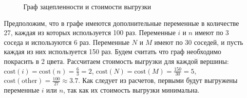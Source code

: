 \begin{figure}[H]
    \centering
    \caption{Граф зацепленности и стоимости выгрузки}
\end{figure}


Предположим, что в графе имеются дополнительные переменные в количестве 27, каждая из которых используется 100 раз.  
Переменные $i$ и $n$ имеют по 3 соседа и используются 6 раз.
Переменные $N$ и $M$ имеют по 30 соседей, и пусть каждая из них используется 150 раз.
Будем считать что граф необходимо покрасить в 2 цвета.
Рассчитаем стоимость выгрузки для каждой вершины:
$\text{cost}(i) = \text{cost}(n) = \frac{6}{3} = 2$,
$\text{cost}(N) = \text{cost}(M) = \frac{150}{30} = 5$,
$\text{cost}(\text{other}) = \frac{100}{27} \approx 3.7$.
Как следует из расчетов, первыми будут выгружены переменные $i$ или $n$, так как их стоимость выгрузки минимальна.

